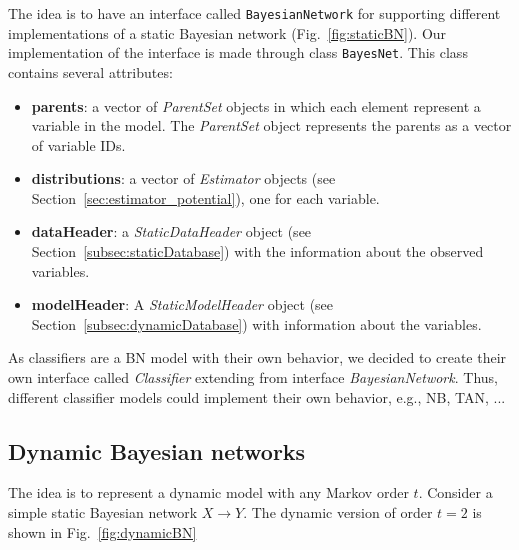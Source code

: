 \documentclass[a4paper,12pt]{article}
\begin{document}
The idea is to have an interface called \texttt{BayesianNetwork} for supporting 
different implementations of a static Bayesian network (Fig.~\ref{fig:staticBN}). Our implementation of the 
interface is made through class \texttt{BayesNet}. This class contains several 
attributes:

\begin{itemize}
\item {\bf parents}: a vector of \emph{ParentSet} objects in which each element represent a 
variable in the model. The \emph{ParentSet} object represents the parents as a 
vector of variable IDs. 
\item {\bf distributions}: a vector of \emph{Estimator} objects (see Section~\ref{sec:estimator_potential}), one 
for each variable. 
\item {\bf dataHeader}: a \emph{StaticDataHeader} object (see Section~\ref{subsec:staticDatabase}) with 
the information about the observed variables. 
\item {\bf modelHeader}: A \emph{StaticModelHeader} object (see Section~\ref{subsec:dynamicDatabase}) 
with information about the variables.

\end{itemize}

As classifiers are a BN model with their own behavior, we decided to create their 
own interface called \emph{Classifier} extending from interface 
\emph{BayesianNetwork}. Thus, different classifier models could implement their 
own behavior, e.g., NB, TAN, ...






\subsection{Dynamic Bayesian networks}
\label{subsec:dynamicBNs}

The idea is to represent a dynamic model with any Markov order $t$. Consider a simple 
static Bayesian network $X \rightarrow Y$. The dynamic version of order $t=2$ 
is shown in Fig.~\ref{fig:dynamicBN}
\end{document}
